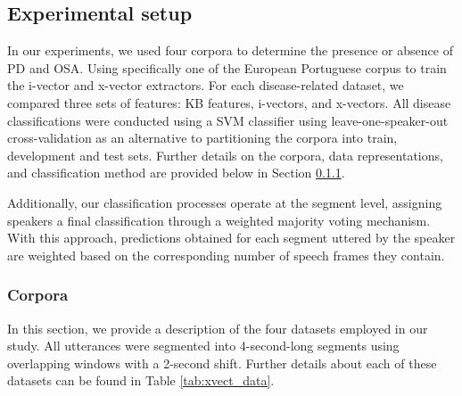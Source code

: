 \subsection{Experimental setup}
In our experiments, we used four corpora to determine the presence or absence of \ac{PD} and \ac{OSA}. Using specifically one of the European Portuguese corpus to train the i-vector and x-vector extractors. For each disease-related dataset, we compared three sets of features: \ac{KB} features, i-vectors, and x-vectors. All disease classifications were conducted using a \ac{SVM} classifier using leave-one-speaker-out cross-validation as an alternative to partitioning the corpora into train, development and test sets. Further details on the corpora, data representations, and classification method are provided below in Section \ref{sec:corpora_xvector_path}.

Additionally, our classification processes operate at the segment level, assigning speakers a final classification through a weighted majority voting mechanism. With this approach, predictions obtained for each segment uttered by the speaker are weighted based on the corresponding number of speech frames they contain.

\subsubsection{Corpora}
\label{sec:corpora_xvector_path}
In this section, we provide a description of the four datasets employed in our study. All utterances were segmented into 4-second-long segments using overlapping windows with a 2-second shift. Further details about each of these datasets can be found in Table \ref{tab:xvect_data}.

